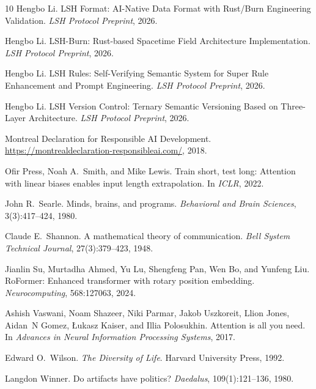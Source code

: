 \documentclass{article}
\begin{document}
\begin{thebibliography}{10}
Hengbo Li.
\newblock LSH Format: AI-Native Data Format with Rust/Burn Engineering Validation.
\newblock \emph{LSH Protocol Preprint}, 2026.

Hengbo Li.
\newblock LSH-Burn: Rust-based Spacetime Field Architecture Implementation.
\newblock \emph{LSH Protocol Preprint}, 2026.

Hengbo Li.
\newblock LSH Rules: Self-Verifying Semantic System for Super Rule Enhancement and Prompt Engineering.
\newblock \emph{LSH Protocol Preprint}, 2026.

Hengbo Li.
\newblock LSH Version Control: Ternary Semantic Versioning Based on Three-Layer Architecture.
\newblock \emph{LSH Protocol Preprint}, 2026.

Montreal Declaration for Responsible AI Development.
\newblock \url{https://montrealdeclaration-responsibleai.com/}, 2018.

Ofir Press, Noah A.~Smith, and Mike Lewis.
\newblock Train short, test long: Attention with linear biases enables input length extrapolation.
\newblock In \textit{ICLR}, 2022.

John R.~Searle.
\newblock Minds, brains, and programs.
\newblock \textit{Behavioral and Brain Sciences}, 3(3):417--424, 1980.

Claude E.~Shannon.
\newblock A mathematical theory of communication.
\newblock \textit{Bell System Technical Journal}, 27(3):379--423, 1948.

Jianlin Su, Murtadha Ahmed, Yu Lu, Shengfeng Pan, Wen Bo, and Yunfeng Liu.
\newblock RoFormer: Enhanced transformer with rotary position embedding.
\newblock \textit{Neurocomputing}, 568:127063, 2024.

Ashish Vaswani, Noam Shazeer, Niki Parmar, Jakob Uszkoreit, Llion Jones, Aidan~N Gomez, {\L}ukasz Kaiser, and Illia Polosukhin.
\newblock Attention is all you need.
\newblock In \textit{Advances in Neural Information Processing Systems}, 2017.

Edward O.~Wilson.
\newblock \textit{The Diversity of Life}.
\newblock Harvard University Press, 1992.

Langdon Winner.
\newblock Do artifacts have politics?
\newblock \textit{Daedalus}, 109(1):121--136, 1980.

\end{thebibliography}
\end{document}
